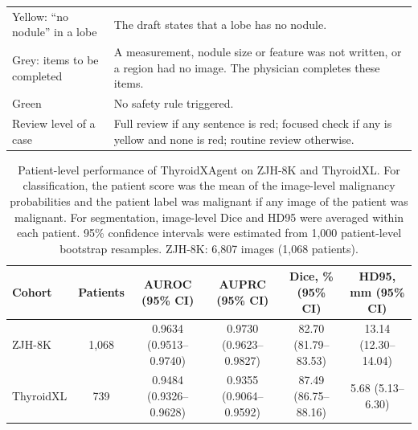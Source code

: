 \documentclass[fleqn,10pt]{wlscirep}
\begin{document}
\begin{appendices}
\begin{table}[p]
\begin{threeparttable}
\begin{tabular}{>{\raggedright\arraybackslash}p{}>{\raggedright\arraybackslash}p{}}
Yellow: ``no nodule'' in a lobe & The draft states that a lobe has no nodule. \\
Grey: items to be completed & A measurement, nodule size or feature was not written, or a region had no image. The physician completes these items. \\
Green & No safety rule triggered. \\
Review level of a case & Full review if any sentence is red; focused check if any is yellow and none is red; routine review otherwise. \\
\bottomrule
\end{tabular}

\end{threeparttable}
\end{table}
\clearpage

\begin{table}[p]
\centering
\begin{threeparttable}

\caption{Patient-level performance of ThyroidXAgent on ZJH-8K and ThyroidXL. For classification, the patient score was the mean of the image-level malignancy probabilities and the patient label was malignant if any image of the patient was malignant. For segmentation, image-level Dice and HD95 were averaged within each patient. 95\% confidence intervals were estimated from 1{,}000 patient-level bootstrap resamples. ZJH-8K: 6{,}807 images (1{,}068 patients).}
\label{tab:patient_level}

\footnotesize
\setlength{\tabcolsep}{5.5pt}
\renewcommand{\arraystretch}{1.08}

\begin{tabular}{lccccc}
\toprule
\textbf{Cohort} & \textbf{Patients} & \textbf{AUROC (95\% CI)} & \textbf{AUPRC (95\% CI)} & \textbf{Dice, \% (95\% CI)} & \textbf{HD95, mm (95\% CI)} \\
\midrule
ZJH-8K & 1,068 & 0.9634 (0.9513--0.9740) & 0.9730 (0.9623--0.9827) & 82.70 (81.79--83.53) & 13.14 (12.30--14.04) \\
ThyroidXL & 739 & 0.9484 (0.9326--0.9628) & 0.9355 (0.9064--0.9592) & 87.49 (86.75--88.16) & 5.68 (5.13--6.30) \\
\bottomrule
\end{tabular}
\end{threeparttable}
\end{table}
\clearpage

\begin{table}[p]
\centering
\begin{threeparttable}


\end{threeparttable}
\end{table}
\end{appendices}
\end{document}
